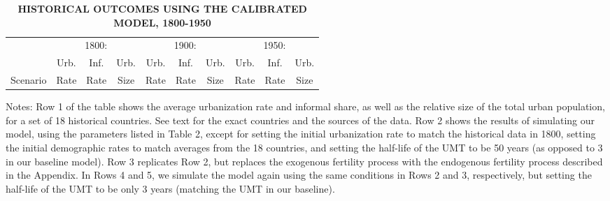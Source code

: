 \documentclass[10pt]{article}
\begin{document}
\begin{table}[htb]
\begin{center}
\begin{footnotesize}
\caption{\textbf{HISTORICAL OUTCOMES USING THE CALIBRATED MODEL, 1800-1950}} \label{tab_longrun}
\begin{tabular}{lccccccccc}
\midrule
         & \multicolumn{3}{c}{1800:} & \multicolumn{3}{c}{1900:} & \multicolumn{3}{c}{1950:} \\ \cmidrule(lr){2-4} \cmidrule(lr){5-7} \cmidrule(lr){8-10}
         & Urb. & Inf. & Urb. & Urb. & Inf. & Urb. & Urb. & Inf. & Urb. \\
Scenario & Rate & Rate & Size & Rate & Rate & Size & Rate & Rate & Size  \\ \midrule

\midrule
\end{tabular}
\end{footnotesize}
\end{center}
Notes: Row 1 of the table shows the average urbanization rate and informal share, as well as the relative size of the total urban population, for a set of 18 historical countries. See text for the exact countries and the sources of the data. Row 2 shows the results of simulating our model, using the parameters listed in Table 2, except for setting the initial urbanization rate to match the historical data in 1800, setting the initial demographic rates to match averages from the 18 countries, and setting the half-life of the UMT to be 50 years (as opposed to 3 in our baseline model). Row 3 replicates Row 2, but replaces the exogenous fertility process with the endogenous fertility process described in the Appendix. In Rows 4 and 5, we simulate the model again using the same conditions in Rows 2 and 3, respectively, but setting the half-life of the UMT to be only 3 years (matching the UMT in our baseline). 
\end{table}
\end{document}
